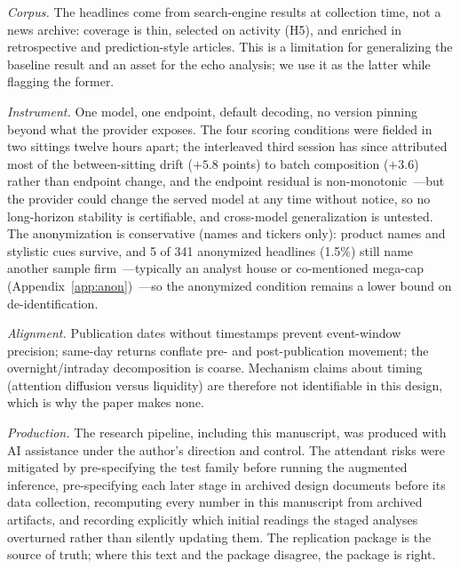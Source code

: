 \emph{Corpus.} The headlines come from search-engine results at collection time, not a news archive: coverage is thin, selected on activity (H5), and enriched in retrospective and prediction-style articles. This is a limitation for generalizing the baseline result and an asset for the echo analysis; we use it as the latter while flagging the former.

\emph{Instrument.} One model, one endpoint, default decoding, no version pinning beyond what the provider exposes. The four scoring conditions were fielded in two sittings twelve hours apart; the interleaved third session has since attributed most of the between-sitting drift ($+5.8$ points) to batch composition ($+3.6$) rather than endpoint change, and the endpoint residual is non-monotonic~---but the provider could change the served model at any time without notice, so no long-horizon stability is certifiable, and cross-model generalization is untested. The anonymization is conservative (names and tickers only): product names and stylistic cues survive, and 5 of 341 anonymized headlines (1.5\%) still name another sample firm~---typically an analyst house or co-mentioned mega-cap (Appendix~\ref{app:anon})~---so the anonymized condition remains a lower bound on de-identification.

\emph{Alignment.} Publication dates without timestamps prevent event-window precision; same-day returns conflate pre- and post-publication movement; the overnight/intraday decomposition is coarse. Mechanism claims about timing (attention diffusion versus liquidity) are therefore not identifiable in this design, which is why the paper makes none.

\emph{Production.} The research pipeline, including this manuscript, was produced with AI assistance under the author's direction and control. The attendant risks were mitigated by pre-specifying the test family before running the augmented inference, pre-specifying each later stage in archived design documents before its data collection, recomputing every number in this manuscript from archived artifacts, and recording explicitly which initial readings the staged analyses overturned rather than silently updating them. The replication package is the source of truth; where this text and the package disagree, the package is right.
